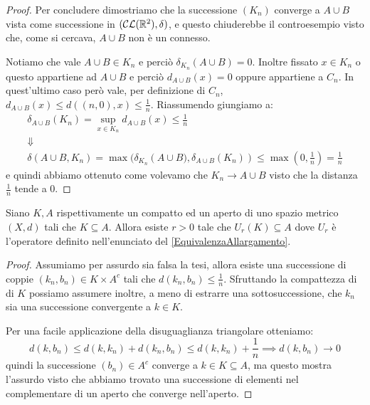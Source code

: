 \begin{proof}
	Per concludere dimostriamo che la successione $(K_n)$ converge a $A\cup B$ vista come successione in $(\mathcal{CL}(\mathbb R^2),\delta)$, e questo chiuderebbe il controesempio visto che, come si cercava, $A\cup B$ non è un connesso.
	
	Notiamo che vale $A\cup B\in K_n$ e perciò $\delta_{K_n}(A\cup B)=0$. 
	Inoltre fissato $x\in K_n$ o questo appartiene ad $A\cup B$ e perciò $d_{A\cup B}(x)=0$ oppure appartiene a $C_n$. In quest'ultimo caso però vale, per definizione di $C_n$, $d_{A\cup B}(x)\le d\left((n,0),x\right)\le \frac 1n$. Riassumendo giungiamo a:
	\begin{gather*}
		\delta_{A\cup B}(K_n)=\sup_{x\in K_n} d_{A\cup B}(x)\le \frac 1n \\
		\Downarrow \\
		\delta(A\cup B,K_n)=\max(\delta_{K_n}\left(A\cup B),\delta_{A\cup B}(K_n)\right)\le \max\left(0,\frac1n\right)=\frac 1n
	\end{gather*}
	e quindi abbiamo ottenuto come volevamo che $K_n\to A\cup B$ visto che la distanza $\frac 1n$ tende a $0$.
\end{proof}

\begin{lemma}\label{CompattoInAperto}
	Siano $K,A$ rispettivamente un compatto ed un aperto di uno spazio metrico $(X,d)$ tali che $K\subseteq A$. Allora esiste $r>0$ tale che $U_r(K)\subseteq A$ dove $U_r$ è l'operatore definito nell'enunciato del \cref{EquivalenzaAllargamento}.
\end{lemma}
\begin{proof}
	Assumiamo per assurdo sia falsa la tesi, allora esiste una successione di coppie $(k_n,b_n)\in K\times A^c$ tali che $d(k_n,b_n)\le \frac 1n$.
	Sfruttando la compattezza di di $K$ possiamo assumere inoltre, a meno di estrarre una sottosuccessione, che $k_n$ sia una successione convergente a $k\in K$.
	
	Per una facile applicazione della disuguaglianza triangolare otteniamo:
	\begin{equation}
		d(k,b_n)\le d(k,k_n)+d(k_n,b_n)\le d(k,k_n)+\frac 1n \implies d(k,b_n)\to 0
	\end{equation}
	quindi la successione $(b_n)\in A^c$ converge a $k\in K\subseteq A$, ma questo mostra l'assurdo visto che abbiamo trovato una successione di elementi nel complementare di un aperto che converge nell'aperto.

\end{proof}



